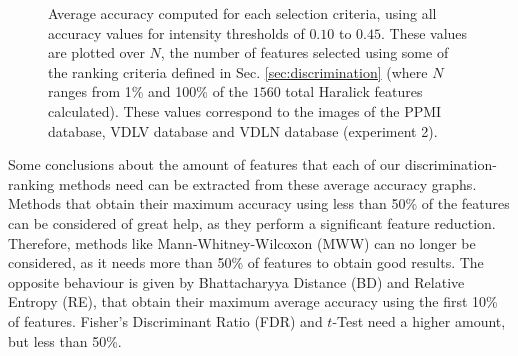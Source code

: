 \begin{figure}
	\centering
	\caption{Average accuracy computed for each selection criteria, using all accuracy values for intensity thresholds of $0.10$ to $0.45$. These values are plotted over $N$, the number of features selected using some of the ranking criteria defined in Sec. \ref{sec:discrimination} (where $N$ ranges from 1\% and 100\% of the $1560$ total Haralick features calculated). These values correspond to the images of the \protect{} PPMI database, \protect{} VDLV database and \protect{} VDLN database (experiment 2).}
	\label{fig:experiment4}
\end{figure}

Some conclusions about the amount of features that each of our discrimination-ranking methods need can be extracted from these average accuracy graphs. Methods that obtain their maximum accuracy using less than 50\% of the features can be considered of great help, as they perform a significant feature reduction. Therefore, methods like Mann-Whitney-Wilcoxon (MWW) can no longer be considered, as it needs more than 50\% of features to obtain good results. The opposite behaviour is given by Bhattacharyya Distance (BD) and Relative Entropy (RE), that obtain their maximum average accuracy using the first 10\% of features. Fisher's Discriminant Ratio (FDR) and $t$-Test need a higher amount, but less than 50\%. 

